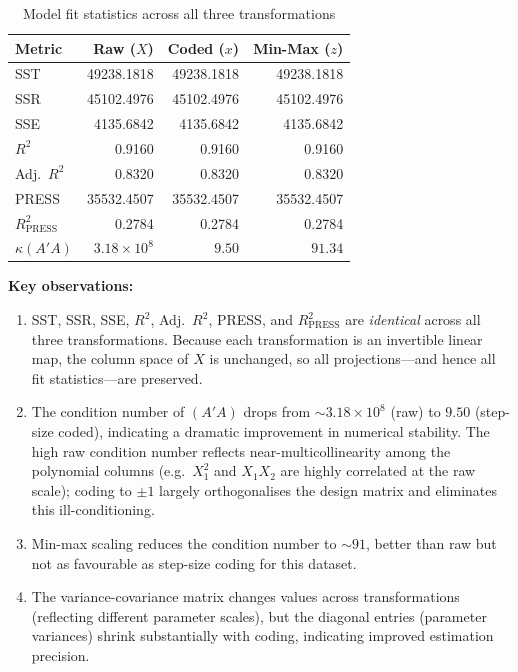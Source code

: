 \documentclass[12pt,a4paper]{article}
\begin{document}
\begin{table}[H]
\centering
\caption{Model fit statistics across all three transformations}
\begin{tabular}{lrrr}
\toprule
Metric & Raw ($X$) & Coded ($x$) & Min-Max ($z$) \\
\midrule
SST                          &  49238.1818 &  49238.1818 &  49238.1818 \\
SSR                          &  45102.4976 &  45102.4976 &  45102.4976 \\
SSE                          &   4135.6842 &   4135.6842 &   4135.6842 \\
$R^2$                        &      0.9160 &      0.9160 &      0.9160 \\
Adj.\ $R^2$                 &      0.8320 &      0.8320 &      0.8320 \\
PRESS                        &  35532.4507 &  35532.4507 &  35532.4507 \\
$R^2_{\text{PRESS}}$         &      0.2784 &      0.2784 &      0.2784 \\
$\kappa(A'A)$                & $3.18\times10^{8}$ & $9.50$ & $91.34$ \\
\bottomrule
\end{tabular}
\end{table}

\textbf{Key observations: }
\begin{enumerate}[label=\arabic*.]
  \item SST, SSR, SSE, $R^2$, Adj.\ $R^2$, PRESS, and $R^2_{\text{PRESS}}$ are
        \emph{identical} across all three transformations. Because each transformation
        is an invertible linear map, the column space of $X$ is unchanged, so all
        projections—and hence all fit statistics—are preserved.
  \item The condition number of $(A'A)$ drops from $\sim 3.18\times10^{8}$ (raw) to
        $9.50$ (step-size coded), indicating a dramatic improvement in numerical
        stability. The high raw condition number reflects near-multicollinearity among
        the polynomial columns (e.g.\ $X_1^2$ and $X_1 X_2$ are highly correlated at
        the raw scale); coding to $\pm 1$ largely orthogonalises the design matrix and
        eliminates this ill-conditioning.
  \item Min-max scaling reduces the condition number to $\sim 91$, better than raw but
        not as favourable as step-size coding for this dataset.
  \item The variance-covariance matrix changes values across transformations (reflecting
        different parameter scales), but the diagonal entries (parameter variances)
        shrink substantially with coding, indicating improved estimation precision.
\end{enumerate}
\end{document}
